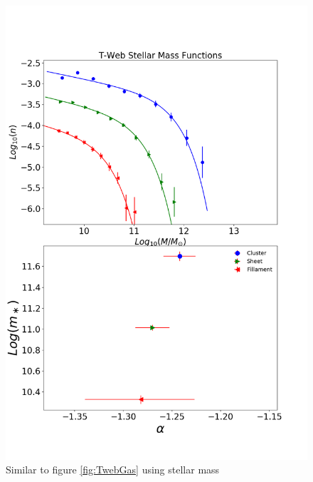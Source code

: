 \documentclass[a4paper,fleqn,usenatbib]{mnras}
\begin{document}
\begin{figure}
	\includegraphics[width=\columnwidth]{./pics/F19_T-Web_Stellar.png}
    \caption{Similar to figure \ref{fig:TwebGas} using stellar mass} 
    \label{fig:TwebStellar}
\end{figure}
\end{document}
